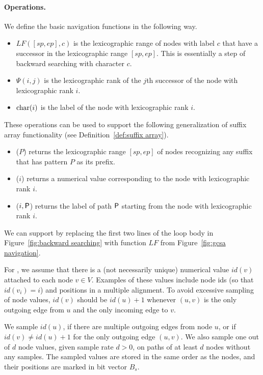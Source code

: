 \paragraph{Operations.}

We define the basic navigation functions in the following way.
\begin{itemize}
\item $LF([sp,ep], c)$ is the lexicographic range of nodes with label $c$ that have a successor in the lexicographic range $[sp,ep]$. This is essentially a step of backward searching with character $c$.
\item $\Psi(i, j)$ is the lexicographic rank of the $j$th successor of the node with lexicographic rank $i$.
\item $\operatorname{char}(i)$ is the label of the node with lexicographic rank $i$.
\end{itemize}

These operations can be used to support the following generalization of suffix array functionality (see Definition~\ref{def:suffix array}).
\begin{itemize}
\item \find($P$) returns the lexicographic range $[sp, ep]$ of nodes recognizing any suffix that has pattern $P$ as its prefix.
\item \locate($i$) returns a numerical value corresponding to the node with lexicographic rank $i$.
\item \extract($i, \mathsf{P}$) returns the label of path $\mathsf{P}$ starting from the node with lexicographic rank $i$.
\end{itemize}

We can support \find{} by replacing the first two lines of the loop body in Figure~\ref{fig:backward searching} with function $LF$ from Figure~\ref{fig:gcsa navigation}.

For \locate, we assume that there is a (not necessarily unique) numerical value $id(v)$ attached to each node $v \in V$. Examples of these values include node ids (so that $id(v_{i}) = i$) and positions in a multiple alignment. To avoid excessive sampling of node values, $id(v)$ should be $id(u) + 1$ whenever $(u,v)$ is the only outgoing edge from $u$ and the only incoming edge to $v$.

We sample $id(u)$, if there are multiple outgoing edges from node $u$, or if $id(v) \ne id(u) + 1$ for the only outgoing edge $(u, v)$. We also sample one out of $d$ node values, given sample rate $d > 0$, on paths of at least $d$ nodes without any samples. The sampled values are stored in the same order as the nodes, and their positions are marked in bit vector $B_{s}$.

